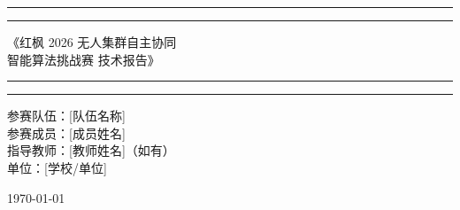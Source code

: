 \begin{titlepage}
	\centering
	\scshape
	\vspace*{1.5\baselineskip}

	\rule{13cm}{1.6pt}\vspace*{-\baselineskip}\vspace*{2pt}
	\rule{13cm}{0.4pt}

		\vspace{0.75\baselineskip}
	{
        \Huge
			《红枫 2026 无人集群自主协同\\[0.3em]智能算法挑战赛 技术报告》 \\
    }
		\vspace{0.75\baselineskip}
	\rule{13cm}{0.4pt}\vspace*{-\baselineskip}\vspace{3.2pt}
	\rule{13cm}{1.6pt}

		\vspace{1.75\baselineskip}
	{\large
		参赛队伍：[队伍名称] \\
		\vspace*{1.2\baselineskip}
		参赛成员：[成员姓名] \\
		\vspace*{1.2\baselineskip}
		指导教师：[教师姓名]（如有） \\
		\vspace*{1.2\baselineskip}
		单位：[学校/单位] \\
	}
	\vfill

	{\large \today}

\end{titlepage}
